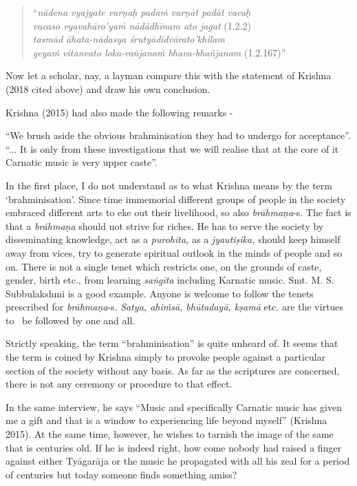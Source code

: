 \begin{verse}
“\textit{nādena vyajyate varṇaḥ padaṁ varṇāt padāt vacaḥ} \\ \textit{vacaso vyavahāro’yaṁ nādādhīnam ato jagat}  (1.2.2)\\ \textit{tasmād āhata-nādasya śrutyādidvārato’khilam} \\ \textit{geyaṁ vitanvato loka-rañjanaṁ bhava-bhañjanam}  (1.2.167)”
\end{verse}

Now let a scholar, nay, a layman compare this with the statement of Krishna (2018 cited above) and draw his own conclusion.

Krishna (2015) had also made the following remarks -  

\begin{myquote}
“We brush aside the obvious brahminisation they had to undergo for acceptance”. “... It is only from these investigations that we will realise that at the core of it Carnatic music is very upper caste”.
\end{myquote}

In the first place, I do not understand as to what Krishna means by the term ‘brahminisation’. Since time immemorial different groups of people in the society embraced different arts to eke out their livelihood, so also \textit{brāhmaṇa}-s. The fact is that a \textit{brāhmaṇa} should not strive for riches. He has to serve the society by disseminating knowledge, act as a \textit{purohita,} as a \textit{jyautiṣika,} should keep himself away from vices, try to generate spiritual outlook in the minds of people and so on. There is not a single tenet which restricts one, on the grounds of caste, gender, birth etc., from learning \textit{saṅgīta} including Karnatic music. Smt. M. S. Subbulakshmi is a good example. Anyone is welcome to follow the tenets prescribed for \textit{brāhmaṇa}-s. \textit{Satya, ahiṁsā, bhūtadayā, kṣamā} etc. are the virtues to  be followed by one and all. 

Strictly speaking, the term “brahminisation” is quite unheard of. It seems that the term is coined by Krishna simply to provoke people against a particular section of the society without any basis. As far as the scriptures are concerned, there is not any ceremony or procedure to that effect.

In the same interview, he says “Music and specifically Carnatic music has given me a gift and that is a window to experiencing life beyond myself” (Krishna 2015). At the same time, however, he wishes to tarnish the image of the same that is centuries old. If he is indeed right, how come nobody had raised a finger against either Tyāgarāja or the music he propagated with all his zeal for a period of centuries but today someone finds something amiss? 


